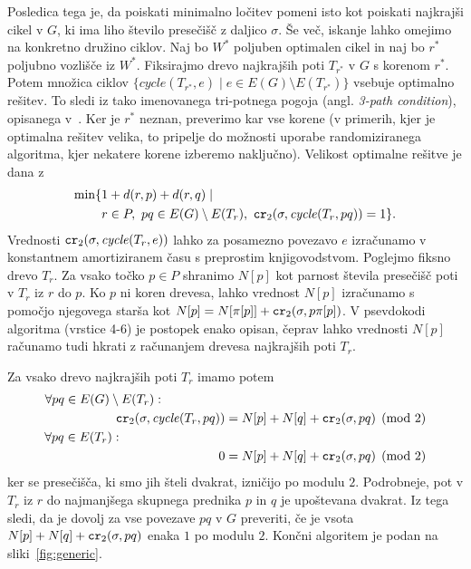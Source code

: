 \documentclass[a4paper, 12pt]{book}
\newcommand{\cycle}{\mathit{cycle}}
\newcommand\CR{\mbox{\tt cr}_2}		  %
\begin{document}
Posledica tega je, da poiskati minimalno ločitev pomeni isto kot poiskati najkrajši cikel v $G$, ki ima liho število presečišč z daljico $\sigma$. Še več, iskanje lahko omejimo na konkretno družino ciklov. Naj bo $W^*$ poljuben optimalen cikel in naj bo $r^*$ poljubno vozlišče iz $W^*$. Fiksirajmo drevo najkrajših poti $T_{r^*}$ v $G$ s korenom $r^*$. Potem množica ciklov $\{ \cycle(T_{r^*},e)\mid e\in E(G)\setminus E(T_{r^*})\}$ vsebuje optimalno rešitev. To sledi iz tako imenovanega tri-potnega pogoja (angl. \textit{3-path condition}), opisanega v~\cite{CG16}. Ker   je $r^*$ neznan, preverimo kar vse korene (v primerih, kjer je optimalna rešitev velika, to pripelje do možnosti uporabe randomiziranega algoritma, kjer nekatere korene izberemo naključno). Velikost optimalne rešitve je dana z
\begin{align*}
\min \{& 1+d(r,p)+d(r,q) \mid \\
	   & r\in P,~ pq\in E(G)\setminus E(T_r),~
		\CR(\sigma,\cycle(T_{r},pq))=1 \} .
\end{align*}
Vrednosti $\CR (\sigma, \cycle(T_r,e))$ lahko za posamezno povezavo $e$ izračunamo v konstantnem amortiziranem času s preprostim knjigovodstvom.  Poglejmo fiksno drevo $T_r$. Za vsako točko $p\in P$ shranimo $N[p]$ kot parnost števila presečišč poti v $T_r$ iz $r$ do $p$. Ko $p$ ni koren drevesa, lahko vrednost $N[p]$ izračunamo s pomočjo njegovega starša kot $N[p]=N[\pi[p]]+\CR(\sigma,p\pi[p])$. V psevdokodi algoritma (vrstice 4-6) je  postopek enako opisan, čeprav lahko vrednosti $N[p]$ računamo tudi hkrati z računanjem drevesa najkrajših poti $T_r$.

Za vsako drevo najkrajših poti $T_r$ imamo potem 
\begin{align*}
	\forall pq\in E(G)\setminus E(T_r):~~~~~~~~~~~~~~~~~~~~~~~~~~~~~~~~~~~~~~~~~~~~~~~~~~~~~~~~~~~~~~~\\
	\CR (\sigma, \cycle(T_r,pq)) =N[p]+N[q]+\CR(\sigma,pq) \pmod 2\\
	\forall pq\in E(T_r):~~~~~~~~~~~~~~~~~~~~~~~~~~~~~~~~~~~~~~~~~~~~~~~~~~~~~~~~~~~~~~~~~~~~~~~~~\\
	0 =N[p]+N[q]+\CR(\sigma,pq) \pmod 2
\end{align*}
ker se presečišča, ki smo jih šteli dvakrat, izničijo po modulu $2$. Podrobneje, pot v $T_r$ iz $r$ do najmanjšega skupnega prednika $p$ in $q$ je upoštevana dvakrat. Iz tega sledi, da je dovolj za vse povezave $pq$ v $G$ preveriti, če je vsota $N[p]+N[q]+\CR(\sigma,pq)$ enaka $1$ po modulu $2$. Končni algoritem je podan na sliki~\ref{fig:generic}.
\end{document}
